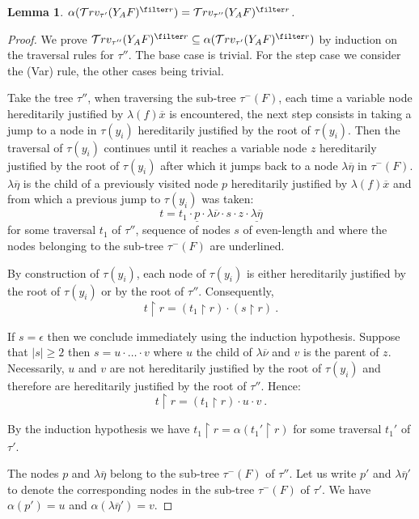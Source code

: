 \documentclass{article}
\newtheorem{lemma}[theorem]{Lemma}
\newcommand{\travset}{\mathcal{T}rv}
\begin{document}
\begin{lemma}
$\alpha(\travset_{\tau'}(Y_A F)^{\filter r}) = \travset_{\tau''}(Y_A F)^{\filter r}$.
\end{lemma}
\begin{proof}
We prove $\travset_{\tau''}(Y_A F)^{\filter r} \subseteq \alpha(\travset_{\tau'}(Y_A F)^{\filter r})$ by induction on the traversal rules for $\tau''$.
The base case is trivial. For the step case we consider the (Var) rule, the other cases being trivial.

Take the tree $\tau''$, when traversing the sub-tree $\tau^-(F)$, each time a variable node hereditarily justified by $\lambda (f) \overline{x}$ is encountered, the next step consists in taking a jump to a node in $\tau(y_i)$ hereditarily justified by the root of $\tau(y_i)$. Then the traversal of $\tau(y_i)$ continues until it reaches a variable node $z$ hereditarily justified by the root of $\tau(y_i)$ after which it jumps back to a node $\lambda \overline{\eta}$ in $\tau^-(F)$. $\lambda \overline{\eta}$ is the child of a previously visited node $p$ hereditarily justified by $\lambda (f) \overline{x}$ and from which a previous jump to $\tau(y_i)$ was taken:
$$ t = t_1 \cdot \underline{p} \cdot \lambda \overline{\nu} \cdot s \cdot z \cdot \underline{\lambda \overline{\eta}}$$
for some traversal $t_1$ of $\tau''$, sequence of nodes $s$ of even-length and where the nodes belonging to the sub-tree $\tau^-(F)$ are underlined.

By construction of $\tau(y_i)$, each node of $\tau(y_i)$ is either hereditarily justified by the root of $\tau(y_i)$
or by the root of $\tau''$. Consequently,
$$ t\upharpoonright r = (t_1\upharpoonright r) \cdot  (s \upharpoonright r) \ .$$

If $s = \epsilon$ then we conclude immediately using the induction hypothesis.
Suppose that $|s|\geq 2$ then $s = u\cdot \ldots \cdot v$ where $u$ the child of $\lambda \overline{\nu}$ and $v$ is the parent of $z$.
Necessarily, $u$ and $v$ are not hereditarily justified by the root of $\tau(y_i)$ and therefore are hereditarily justified by the root of $\tau''$. Hence:
$$ t\upharpoonright r = (t_1\upharpoonright r) \cdot  u \cdot v \ .$$

By the  induction hypothesis we have $t_1\upharpoonright r = \alpha(t_1'\upharpoonright r)$ for some traversal $t_1'$  of $\tau'$.

The nodes $p$ and $\lambda \overline{\eta}$ belong
to the sub-tree $\tau^-(F)$ of $\tau''$. Let us write $p'$ and $\lambda \overline{\eta}'$ to denote the corresponding nodes in the sub-tree $\tau^-(F)$ of $\tau'$. We have $\alpha(p') = u$ and $\alpha(\lambda \overline{\eta}') = v$.


\end{proof}
\end{document}
